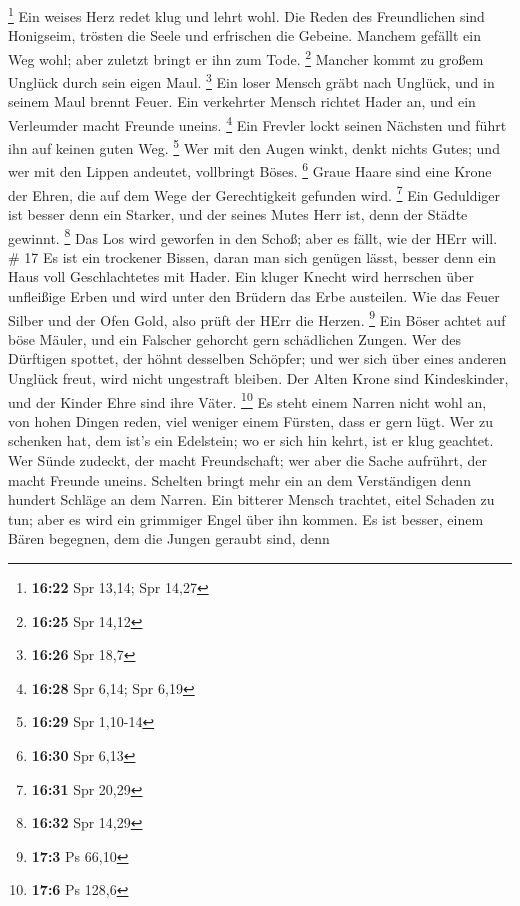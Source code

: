 \footnote{\textbf{16:22} Spr 13,14; Spr 14,27}  Ein weises
Herz redet klug und lehrt wohl.  Die Reden des Freundlichen
sind Honigseim, trösten die Seele und erfrischen die Gebeine.
 Manchem gefällt ein Weg wohl; aber zuletzt bringt er ihn
zum Tode. \footnote{\textbf{16:25} Spr 14,12}  Mancher
kommt zu großem Unglück durch sein eigen Maul. \footnote{\textbf{16:26}
  Spr 18,7}  Ein loser Mensch gräbt nach Unglück, und in
seinem Maul brennt Feuer.  Ein verkehrter Mensch richtet
Hader an, und ein Verleumder macht Freunde uneins. \footnote{\textbf{16:28}
  Spr 6,14; Spr 6,19}  Ein Frevler lockt seinen Nächsten
und führt ihn auf keinen guten Weg. \footnote{\textbf{16:29} Spr 1,10-14}
 Wer mit den Augen winkt, denkt nichts Gutes; und wer mit
den Lippen andeutet, vollbringt Böses. \footnote{\textbf{16:30} Spr 6,13}
 Graue Haare sind eine Krone der Ehren, die auf dem Wege
der Gerechtigkeit gefunden wird. \footnote{\textbf{16:31} Spr 20,29}
 Ein Geduldiger ist besser denn ein Starker, und der seines
Mutes Herr ist, denn der Städte gewinnt. \footnote{\textbf{16:32} Spr
  14,29}  Das Los wird geworfen in den Schoß; aber es
fällt, wie der HErr will. \# 17  Es ist ein trockener
Bissen, daran man sich genügen lässt, besser denn ein Haus voll
Geschlachtetes mit Hader.  Ein kluger Knecht wird herrschen
über unfleißige Erben und wird unter den Brüdern das Erbe austeilen.
 Wie das Feuer Silber und der Ofen Gold, also prüft der HErr
die Herzen. \footnote{\textbf{17:3} Ps 66,10}  Ein Böser
achtet auf böse Mäuler, und ein Falscher gehorcht gern schädlichen
Zungen.  Wer des Dürftigen spottet, der höhnt desselben
Schöpfer; und wer sich über eines anderen Unglück freut, wird nicht
ungestraft bleiben.  Der Alten Krone sind Kindeskinder, und
der Kinder Ehre sind ihre Väter. \footnote{\textbf{17:6} Ps 128,6}
 Es steht einem Narren nicht wohl an, von hohen Dingen
reden, viel weniger einem Fürsten, dass er gern lügt.  Wer
zu schenken hat, dem ist's ein Edelstein; wo er sich hin kehrt, ist er
klug geachtet.  Wer Sünde zudeckt, der macht Freundschaft;
wer aber die Sache aufrührt, der macht Freunde uneins. 
Schelten bringt mehr ein an dem Verständigen denn hundert Schläge an dem
Narren.  Ein bitterer Mensch trachtet, eitel Schaden zu
tun; aber es wird ein grimmiger Engel über ihn kommen.  Es
ist besser, einem Bären begegnen, dem die Jungen geraubt sind, denn
